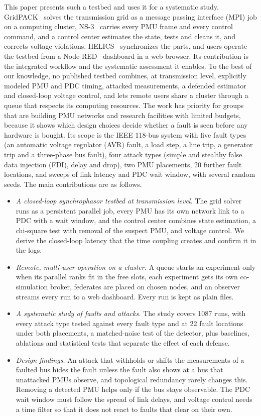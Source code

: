 \documentclass[journal]{IEEEtran}
\begin{document}
This paper presents such a testbed and uses it for a systematic study. GridPACK~\cite{palmer2016gridpack} solves the transmission grid as a message passing interface (MPI) job on a computing cluster, NS-3~\cite{riley2010ns3} carries every PMU frame and every control command, and a control center estimates the state, tests and cleans it, and corrects voltage violations. HELICS~\cite{hardy2024helics} synchronizes the parts, and users operate the testbed from a Node-RED~\cite{nodered} dashboard in a web browser. Its contribution is the integrated workflow and the systematic assessment it enables. To the best of our knowledge, no published testbed combines, at transmission level, explicitly modeled PMU and PDC timing, attacked measurements, a defended estimator and closed-loop voltage control, and lets remote users share a cluster through a queue that respects its computing resources. The work has priority for groups that are building PMU networks and research facilities with limited budgets, because it shows which design choices decide whether a fault is seen before any hardware is bought. Its scope is the IEEE 118-bus system with five fault types (an automatic voltage regulator (AVR) fault, a load step, a line trip, a generator trip and a three-phase bus fault), four attack types (simple and stealthy false data injection (FDI), delay and drop), two PMU placements, 20 further fault locations, and sweeps of link latency and PDC wait window, with several random seeds. The main contributions are as follows.
\begin{itemize}
\item \emph{A closed-loop synchrophasor testbed at transmission level.} The grid solver runs as a persistent parallel job, every PMU has its own network link to a PDC with a wait window, and the control center combines state estimation, a chi-square test with removal of the suspect PMU, and voltage control. We derive the closed-loop latency that the time coupling creates and confirm it in the logs.
\item \emph{Remote, multi-user operation on a cluster.} A queue starts an experiment only when its parallel ranks fit in the free slots, each experiment gets its own co-simulation broker, federates are placed on chosen nodes, and an observer streams every run to a web dashboard. Every run is kept as plain files.
\item \emph{A systematic study of faults and attacks.} The study covers 1087 runs, with every attack type tested against every fault type and at 22 fault locations under both placements, a matched-noise test of the detector, plus baselines, ablations and statistical tests that separate the effect of each defense.
\item \emph{Design findings.} An attack that withholds or shifts the measurements of a faulted bus hides the fault unless the fault also shows at a bus that unattacked PMUs observe, and topological redundancy rarely changes this. Removing a detected PMU helps only if the bus stays observable. The PDC wait window must follow the spread of link delays, and voltage control needs a time filter so that it does not react to faults that clear on their own.
\end{itemize}
\end{document}
